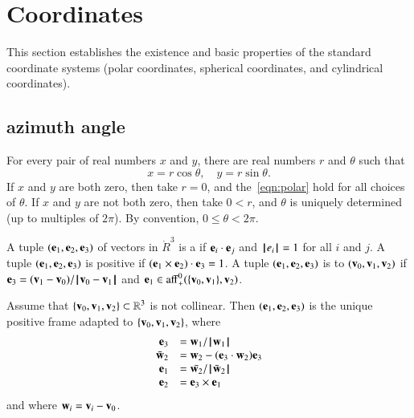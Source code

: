 \section{Coordinates}

This  section  establishes the existence
and basic properties of the standard coordinate systems
(polar coordinates, spherical coordinates, and cylindrical
coordinates).  
%
%
%

\subsection{azimuth angle}

\label{sec:polar}
%
%


For every pair of real numbers $x$ and $y$,  there are real numbers
$r$ and $\theta$ such that
    \begin{equation}\label{eqn:polar}
    x = r\cos\theta,\quad y = r\sin\theta.
    \end{equation}
If $x$ and $y$ are both zero, then take $r=0$, and the~\eqref{eqn:polar} hold for all choices of $\theta$. If $x$
and $y$ are not both zero, then take $0<r$, and $\theta$ is
uniquely determined (up to multiples of $2\pi$).  By convention, 
$0\le\theta < 2\pi$.
%
%







\begin{definition}
A tuple $({\mathbf e}_1,{\mathbf e}_2,{\mathbf e}_3)$ of vectors in $\ring{R}^3$ is a 
 if ${\mathbf e}_i\cdot {\mathbf e}_j$ and ${{\hskip0.1em|\hskip-0.15em|\hskip0.1em}e_i{\hskip0.1em|\hskip-0.15em|\hskip0.1em}}=1$ 
for all $i$ and $j$.
A tuple $({\mathbf e}_1,{\mathbf e}_2,{\mathbf e}_3)$ is positive if $({\mathbf e}_1\times {\mathbf e}_2)\cdot{\mathbf e}_3=1$.
A tuple $({\mathbf e}_1,{\mathbf e}_2,{\mathbf e}_3)$ is  to $({\mathbf v}_0,{\mathbf v}_1,{\mathbf v}_2)$ if
${\mathbf e}_3 = ({\mathbf v}_1-{\mathbf v}_0)/{\hskip0.1em|\hskip-0.15em|\hskip0.1em}{\mathbf v}_0 - {\mathbf v}_1{\hskip0.1em|\hskip-0.15em|\hskip0.1em}$ and
${\mathbf e}_1\in{\operatorname{aff}}_+^0(\{{\mathbf v}_0,{\mathbf v}_1\},{\mathbf v}_2)$.
\end{definition}
%
%

\begin{lemma}[orthonormalization]\label{lemma:frame}
Assume that $\{{\mathbf v}_0,{\mathbf v}_1,{\mathbf v}_2\}\subset\mathbb{R}^3$  is not collinear.  Then
$({\mathbf e}_1,{\mathbf e}_2,{\mathbf e}_3)$ is the  unique positive frame 
adapted to $\{{\mathbf v}_0,{\mathbf v}_1,{\mathbf v}_2\}$, where
$$
\begin{array}{rll}
   {\mathbf e}_3 &= {\mathbf w}_1/{{\hskip0.1em|\hskip-0.15em|\hskip0.1em}{\mathbf w}_1{\hskip0.1em|\hskip-0.15em|\hskip0.1em}}\\
   \bar{{\mathbf w}}_2 &= {\mathbf w}_2 - ({\mathbf e}_3\cdot {\mathbf w}_2) {\mathbf e}_3\\
   {\mathbf e}_1 &= \bar{{\mathbf w}_2}/{{\hskip0.1em|\hskip-0.15em|\hskip0.1em}\bar{{\mathbf w}}_2{\hskip0.1em|\hskip-0.15em|\hskip0.1em}}\\
   {\mathbf e}_2 &= {\mathbf e}_3 \times {\mathbf e}_1 \\
\end{array}
$$
and where ${\mathbf w}_i = {\mathbf v}_i - {\mathbf v}_0$.
\end{lemma}

